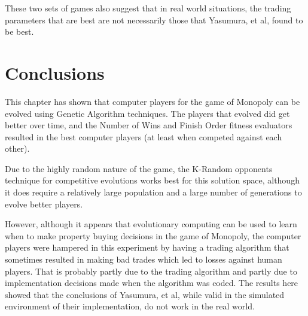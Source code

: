 These two sets of games also suggest that in real world situations, the trading
parameters that are best are not necessarily those that Yasumura, et al, found
to be best. 

\section{Conclusions}

This chapter has shown that computer players for the game of Monopoly can be
evolved using Genetic Algorithm techniques. The players that evolved did get
better over time, and the Number of Wins and Finish Order fitness evaluators
resulted in the best computer players (at least when competed against each
other). 

Due to the highly random nature of the game, the K-Random opponents technique
for competitive evolutions works best for this solution space, although it does
require a relatively large population and a large number of generations to
evolve better players.

However, although it appears that evolutionary computing can be used to learn
when to make property buying decisions in the game of Monopoly, the computer
players were hampered in this experiment by having a trading algorithm that
sometimes resulted in making bad trades which led to losses against human
players. That is probably partly due to the trading algorithm and partly due to
implementation decisions made when the algorithm was coded. The results here
showed that the conclusions of Yasumura, et al, while valid in the simulated
environment of their implementation, do not work in the real world. 

 
